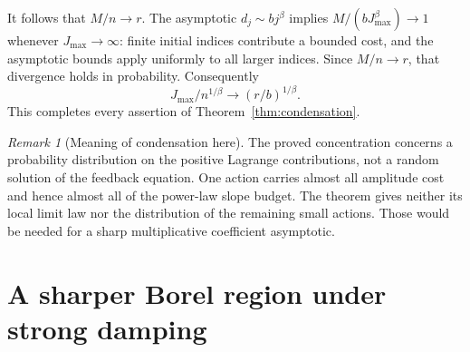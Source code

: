 \documentclass[11pt,a4paper]{article}
\numberwithin{equation}{section}
\theoremstyle{definition}
\theoremstyle{remark}
\newtheorem{remark}[theorem]{Remark}
\theoremstyle{definition}
\begin{document}
It follows that $M/n\to r$. The asymptotic $d_j\sim bj^\beta$ implies
$M/(bJ_{\max}^\beta)\to1$ whenever $J_{\max}\to\infty$: finite initial
indices contribute a bounded cost, and the asymptotic bounds apply
uniformly to all larger indices. Since $M/n\to r$, that divergence
holds in probability. Consequently
\[
 J_{\max}/n^{1/\beta}\to(r/b)^{1/\beta}.
\]
This completes every assertion of Theorem~\ref{thm:condensation}.

\begin{remark}[Meaning of condensation here]
The proved concentration concerns a probability distribution on the
positive Lagrange contributions, not a random solution of the feedback
equation. One action carries almost all amplitude cost and hence almost
all of the power-law slope budget. The theorem gives neither its local
limit law nor the distribution of the remaining small actions. Those
would be needed for a sharp multiplicative coefficient asymptotic.
\end{remark}

\section{A sharper Borel region under strong damping}
\label{sec:sharp-borel}
\end{document}
